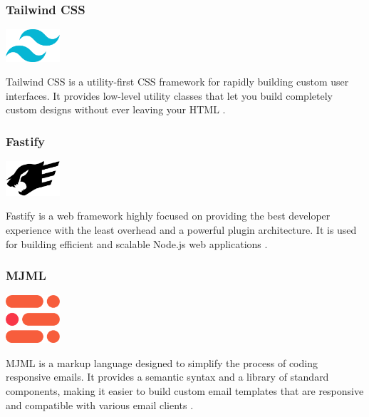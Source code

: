 \clearpage

\subsubsection*{Tailwind CSS}
\begin{center}
\includegraphics[width=0.15\textwidth]{Images/logos/tailwind.png}
\label{fig:tailwind}
\end{center}
Tailwind CSS is a utility-first CSS framework for rapidly building custom user interfaces. It provides low-level utility classes that let you build completely custom designs without ever leaving your HTML \cite{tailwind}.

\subsubsection*{Fastify}
\begin{center}
\includegraphics[width=0.15\textwidth]{Images/logos/fastify.png}
\label{fig:fastify}
\end{center}
Fastify is a web framework highly focused on providing the best developer experience with the least overhead and a powerful plugin architecture. It is used for building efficient and scalable Node.js web applications \cite{fastify}.

\subsubsection*{MJML}
\begin{center}
\includegraphics[width=0.15\textwidth]{Images/logos/file-type-mjml.512x453.png}
\label{fig:MJML}
\end{center}
MJML is a markup language designed to simplify the process of coding responsive emails. It provides a semantic syntax and a library of standard components, making it easier to build custom email templates that are responsive and compatible with various email clients \cite{mjml}.

